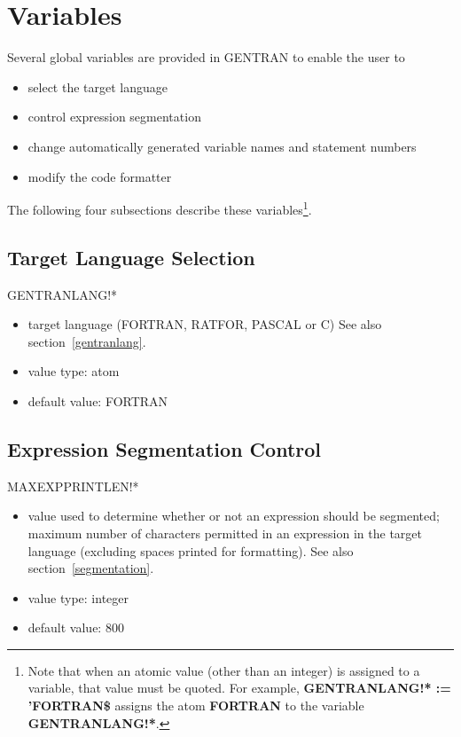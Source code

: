 \section{Variables}
Several global variables are provided in GENTRAN to enable the
user to
\begin{itemize}
\item select the target language
\item control expression segmentation
\item change automatically generated variable names and statement numbers
\item modify the code formatter
\end{itemize}
The following four subsections describe these variables\footnote{
Note that when an atomic value (other than an integer) is assigned to a
variable, that value must be quoted.  For example,
{\bf GENTRANLANG!* := 'FORTRAN\$}
assigns the atom {\bf FORTRAN} to the variable {\bf GENTRANLANG!*}.}.

\subsection{Target Language Selection}
\begin{describe}{GENTRANLANG!*}
\begin{itemize}
\item target language (FORTRAN, RATFOR, PASCAL or C)
See also section~\ref{gentranlang}.
\item value type:  atom
\item default value:  FORTRAN
\end{itemize}
\end{describe}

\subsection{Expression Segmentation Control}
\begin{describe}{MAXEXPPRINTLEN!*}
\begin{itemize}
\item value used to determine whether or not an expression should be
segmented; maximum number of characters permitted in an expression
in the target language (excluding spaces printed for formatting).
See also section~\ref{segmentation}.
\item value type:  integer
\item default value:  800
\end{itemize}
\end{describe} 

